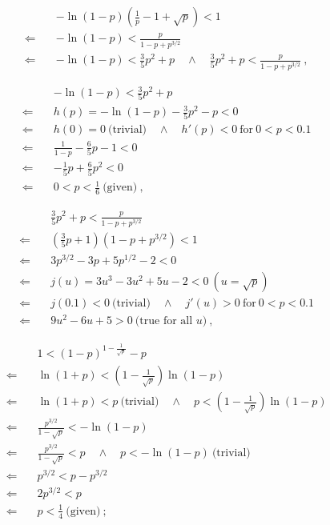 \documentclass[]{article}
\begin{document}
\begin{align*}
&-\ln(1-p)\left(\frac{1}{p} - 1 + \sqrt{p}\right)< 1\\
\Longleftarrow\quad& -\ln(1-p) < \frac{p}{1 - p + p^{3/2}}\\
\Longleftarrow\quad& -\ln(1-p) < \frac{3}{5}p^2+p\quad\wedge\quad\frac{3}{5}p^2+p < \frac{p}{1 - p + p^{3/2}}\ ,
\end{align*}

\begin{align*}
& -\ln(1-p) < \frac{3}{5}p^2+p\\
\Longleftarrow\quad&h(p) = -\ln(1-p) - \frac{3}{5}p^2 - p < 0\\
\Longleftarrow\quad&h(0) = 0\ \mbox{(trivial)} \quad\wedge\quad h'(p) < 0\ \mbox{for}\ 0 < p < 0.1\\
\Longleftarrow\quad&\frac{1}{1-p} -  \frac{6}{5}p - 1 < 0\\
\Longleftarrow\quad&-\frac{1}{5}p + \frac{6}{5}p^2  < 0 \\
\Longleftarrow\quad& 0 < p < \frac{1}{6} \ \mbox{(given)}\ ,
\end{align*}

\begin{align*}
&\frac{3}{5}p^2+p < \frac{p}{1 - p + p^{3/2}}\\
\Longleftarrow\quad&\left(\frac{3}{5}p+1\right)(1 - p + p^{3/2}) < 1\\
\Longleftarrow\quad&  3p^{3/2}- 3p  + 5p^{1/2} -2 < 0\\
\Longleftarrow\quad& j(u) = 3u^3 -3u^2+5u-2 < 0\ (u = \sqrt{p})\\
\Longleftarrow\quad& j(0.1) < 0\ \mbox{(trivial)} \quad\wedge\quad j'(u) > 0 \ \mbox{for}\ 0 < p < 0.1\\
\Longleftarrow\quad& 9u^2 - 6u + 5 > 0 \ \mbox{(true for all $u$)}\ ,
\end{align*}

\begin{align*}
 &1 < (1-p)^{1-\frac{1}{\sqrt{p}}} - p\\
\Longleftarrow\quad& \ln(1 + p) < \left(1-\frac{1}{\sqrt{p}}\right)\ln(1-p)\\
\Longleftarrow\quad& \ln(1 + p) <p\ \mbox{(trivial)}  \quad\wedge\quad p< \left(1-\frac{1}{\sqrt{p}}\right)\ln(1-p)\\
\Longleftarrow\quad&\frac{p^{3/2}}{1-\sqrt{p}}< -\ln(1-p)\\
\Longleftarrow\quad&\frac{p^{3/2}}{1-\sqrt{p}}<p \quad\wedge\quad p< -\ln(1-p)\ \mbox{(trivial)}\\
\Longleftarrow\quad&p^{3/2}<p - p^{3/2}\\
\Longleftarrow\quad&2p^{3/2}<p\\
\Longleftarrow\quad&p<\frac{1}{4} \ \mbox{(given)}\ ;
\end{align*}
\end{document}
